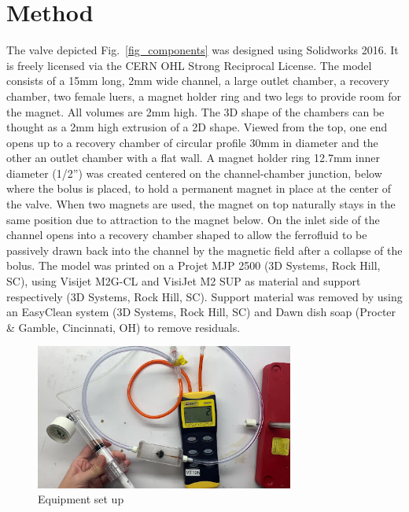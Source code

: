 \documentclass{asme2ej}
\begin{document}
\section{Method}

The valve depicted Fig.~\ref{fig_components}
was designed using Solidworks 2016.
It is freely licensed via the CERN OHL Strong Reciprocal License\cite{stuckey2021,stuckey2021stl}.
The model consists of a 15mm long, 2mm wide channel, a large outlet
chamber, a recovery chamber,
two female luers, a magnet holder ring and two legs to provide room
for the magnet.  All volumes are 2mm high.
The 3D shape
of the chambers can be thought as a 2mm high extrusion of a 2D shape.
Viewed from the top, one end opens up to a recovery
chamber of circular profile 30mm in diameter and the other
an outlet chamber with a flat wall.
A magnet holder ring 12.7mm inner diameter (1/2'') was created centered on the channel-chamber
junction, below where the bolus is placed, to hold a permanent magnet in place
at the center of the valve. When two magnets are used, the magnet on
top naturally stays in the same position due to attraction to the magnet below.
On the inlet side of the channel
opens into a recovery chamber shaped to allow the ferrofluid to be
passively drawn back into the channel by the magnetic field after a
collapse of the bolus.
The model was printed on a Projet MJP 2500 (3D
Systems, Rock Hill, SC), using Visijet M2G-CL and VisiJet M2 SUP as
material and support respectively (3D Systems, Rock Hill, SC). Support
material was removed by using an EasyClean system (3D Systems, Rock
Hill, SC) and Dawn dish soap (Procter \& Gamble, Cincinnati, OH) to
remove residuals.


\begin{figure}
\centerline{\includegraphics[width=3.34in]{figure/Figure2.jpeg}}
\caption{Equipment set up}
\label{fig_equipment}
\end{figure}
\end{document}
